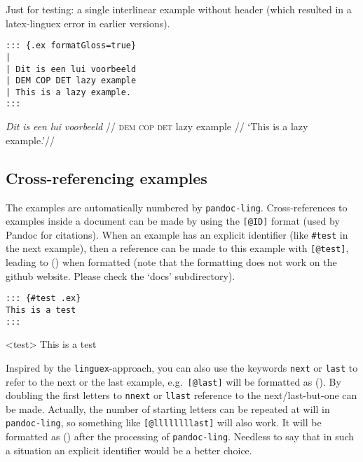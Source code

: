 \documentclass[
]{article}
\begin{document}
Just for testing: a single interlinear example without header (which
resulted in a latex-linguex error in earlier versions).

\begin{verbatim}
::: {.ex formatGloss=true}
|
| Dit is een lui voorbeeld
| DEM COP DET lazy example
| This is a lazy example.
:::
\end{verbatim}

\begin{samepage}
  \begingl
  \gla \emph{Dit} \emph{is} \emph{een} \emph{lui} \emph{voorbeeld} //
  \glb \textsc{dem} \textsc{cop} \textsc{det} lazy example //
  \glft `This is a lazy example.'//
  \endgl
\xe
\end{samepage}

\subsection{Cross-referencing
examples}\label{cross-referencing-examples}

The examples are automatically numbered by \texttt{pandoc-ling}.
Cross-references to examples inside a document can be made by using the
\texttt{{[}@ID{]}} format (used by Pandoc for citations). When an
example has an explicit identifier (like \texttt{\#test} in the next
example), then a reference can be made to this example with
\texttt{{[}@test{]}}, leading to () when formatted (note
that the formatting does not work on the github website. Please check
the `docs' subdirectory).

\begin{verbatim}
::: {#test .ex}
This is a test
:::
\end{verbatim}

\begin{samepage}
\ex<test> 
  This is a test
\xe
\end{samepage}

Inspired by the \texttt{linguex}-approach, you can also use the keywords
\texttt{next} or \texttt{last} to refer to the next or the last example,
e.g.~\texttt{{[}@last{]}} will be formatted as (). By
doubling the first letters to \texttt{nnext} or \texttt{llast} reference
to the next/last-but-one can be made. Actually, the number of starting
letters can be repeated at will in \texttt{pandoc-ling}, so something
like \texttt{{[}@llllllllast{]}} will also work. It will be formatted as
() after the processing of \texttt{pandoc-ling}. Needless to
say that in such a situation an explicit identifier would be a better
choice.
\end{document}

